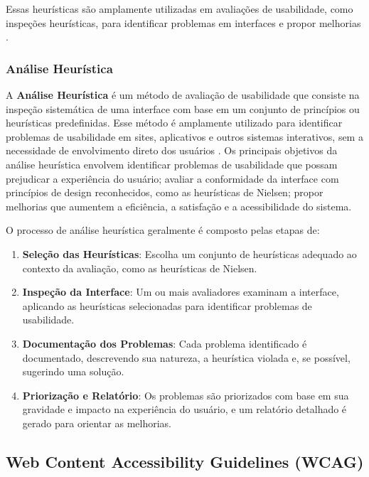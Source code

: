 Essas heurísticas são amplamente utilizadas em avaliações de usabilidade, como inspeções heurísticas, para identificar problemas em interfaces e propor melhorias \citep{Nielsen1994}.

\subsubsection{Análise Heurística}
A \textbf{Análise Heurística} é um método de avaliação de usabilidade que consiste na inspeção sistemática de uma interface com base em um conjunto de princípios ou heurísticas predefinidas. Esse método é amplamente utilizado para identificar problemas de usabilidade em sites, aplicativos e outros sistemas interativos, sem a necessidade de envolvimento direto dos usuários \citep{Nielsen1994}.
Os principais objetivos da análise heurística envolvem identificar problemas de usabilidade que possam prejudicar a experiência do usuário; avaliar a conformidade da interface com princípios de design reconhecidos, como as heurísticas de Nielsen; propor melhorias que aumentem a eficiência, a satisfação e a acessibilidade do sistema.

O processo de análise heurística geralmente é composto pelas etapas de:

\begin{enumerate}
    \item \textbf{Seleção das Heurísticas}: Escolha um conjunto de heurísticas adequado ao contexto da avaliação, como as heurísticas de Nielsen.
    
    \item \textbf{Inspeção da Interface}: Um ou mais avaliadores examinam a interface, aplicando as heurísticas selecionadas para identificar problemas de usabilidade.
    
    \item \textbf{Documentação dos Problemas}: Cada problema identificado é documentado, descrevendo sua natureza, a heurística violada e, se possível, sugerindo uma solução.
    
    \item \textbf{Priorização e Relatório}: Os problemas são priorizados com base em sua gravidade e impacto na experiência do usuário, e um relatório detalhado é gerado para orientar as melhorias.
\end{enumerate}

\subsection{Web Content Accessibility Guidelines (WCAG)}

